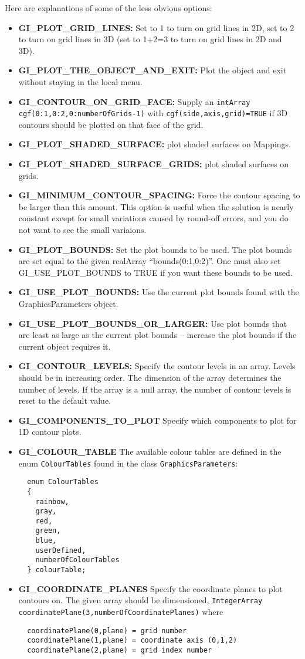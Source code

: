 \documentclass{article}
\newcommand{\Index}[1]{#1\index{#1}}
\begin{document}
\vspace{2\baselineskip}
Here are explanations of some of the less obvious options:
\begin{itemize}
 \item {\bf GI\_PLOT\_GRID\_LINES:} Set to 1 to turn on grid lines in 2D, set to 2 to turn
    on grid lines in 3D (set to 1+2=3 to turn on grid lines in 2D and 3D).
 \item {\bf GI\_PLOT\_THE\_OBJECT\_AND\_EXIT:} Plot the object and exit without
   staying in the local menu. 
 \item {\bf GI\_CONTOUR\_ON\_GRID\_FACE:}  Supply an {\tt intArray cgf(0:1,0:2,0:numberOfGrids-1)}
    with {\tt cgf(side,axis,grid)=TRUE} if 3D contours should be plotted on that face of the grid.
 \item{\bf  GI\_PLOT\_SHADED\_SURFACE:} plot shaded surfaces on Mappings.
 \item{\bf  GI\_PLOT\_SHADED\_SURFACE\_GRIDS:} plot shaded surfaces on grids.
 \item {\bf GI\_MINIMUM\_CONTOUR\_SPACING:} Force the contour spacing
  to be larger than this amount. This option is useful when the solution is
  nearly constant except for small variations caused by round-off errors, and
  you do not want to see the small variaions. 
 \item {\bf GI\_PLOT\_BOUNDS:} Set the plot bounds to be used. The plot bounds
   are set equal to the given realArray ``bounds(0:1,0:2)''. One must also set
   GI\_USE\_PLOT\_BOUNDS to TRUE if you want these bounds to be used.
 \item {\bf GI\_USE\_PLOT\_BOUNDS:} Use the current plot bounds found with the
    GraphicsParameters object.
 \item {\bf GI\_USE\_PLOT\_BOUNDS\_OR\_LARGER:} Use plot bounds that are least as
  large as the current plot bounds -- increase the plot bounds if the current object
  requires it.
 \item {\bf GI\_CONTOUR\_LEVELS:} Specify the contour levels in an array. Levels
  should be in increasing order. The dimension of the array determines the number of levels.
  If the array is a null array, the number of contour levels is reset to the default value.
 \item{\bf GI\_COMPONENTS\_TO\_PLOT} Specify which components to plot for 1D contour plots.
 \item{\bf GI\_COLOUR\_TABLE} The available \Index{colour tables} are defined in the enum 
    {\tt ColourTables} found in the class {\tt GraphicsParameters}:
\begin{verbatim}
  enum ColourTables
  {
    rainbow,
    gray,
    red,
    green,
    blue,
    userDefined,
    numberOfColourTables
  } colourTable;
\end{verbatim}
 \item{\bf GI\_COORDINATE\_PLANES} Specify the coordinate planes to plot contours on. The given array should be
    dimensioned, {\tt IntegerArray coordinatePlane(3,numberOfCoordinatePlanes)} where
\begin{verbatim}
  coordinatePlane(0,plane) = grid number
  coordinatePlane(1,plane) = coordinate axis (0,1,2)
  coordinatePlane(2,plane) = grid index number 
\end{verbatim}


\end{itemize}
\end{document}
